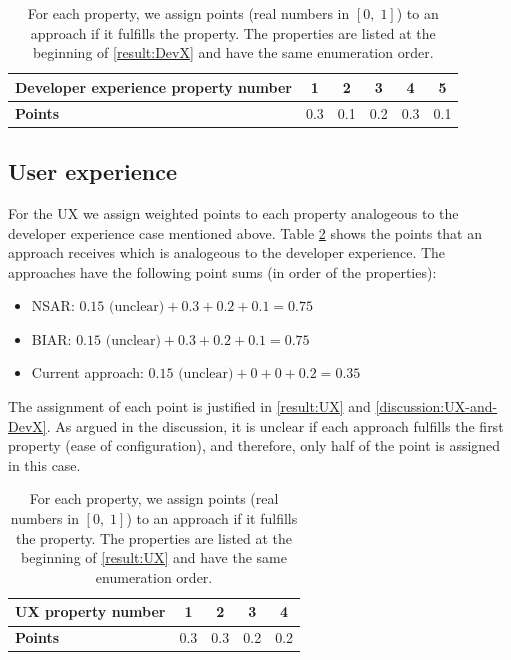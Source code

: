 \begin{table}[h!]
\centering
\begin{tabular}{||m{4cm}||ccccc||} 
\hline
 \textbf{Developer experience property number} & 1 & 2 & 3 & 4 & 5 \\
 \hline
 \textbf{Points} & 0.3 & 0.1 & 0.2 & 0.3 & 0.1 \\ 
 \hline
\end{tabular}
\caption{For each property, we assign points (real numbers in $[0,\;1]$) to an approach if it fulfills the property. The properties are listed at the beginning of \ref{result:DevX} and have the same enumeration order.}
\label{table:devx-points}
\end{table}

\subsection{User experience}
For the UX we assign weighted points to each property analogeous to the developer experience case mentioned above. Table \ref{table:ux-points} shows the points that an approach receives which is analogeous to the developer experience. The approaches have the following point sums (in order of the properties): 
\begin{itemize}
    \item NSAR: $0.15 \text{ (unclear)}+0.3+0.2+0.1 = 0.75$
    \item BIAR: $0.15 \text{ (unclear)}+0.3+0.2+0.1 = 0.75$
    \item Current approach: $0.15 \text{ (unclear)}+0+0+0.2 = 0.35$
\end{itemize}
The assignment of each point is justified in \ref{result:UX} and \ref{discussion:UX-and-DevX}. As argued in the discussion, it is unclear if each approach fulfills the first property (ease of configuration), and therefore, only half of the point is assigned in this case. 

\begin{table}[h!]
\centering
\begin{tabular}{||l||cccc||} 
\hline
 \textbf{UX property number} & 1 & 2 & 3 & 4 \\
 \hline
 \textbf{Points} & 0.3 & 0.3 & 0.2 & 0.2 \\ 
 \hline
\end{tabular}
\caption{For each property, we assign points (real numbers in $[0,\;1]$) to an approach if it fulfills the property. The properties are listed at the beginning of \ref{result:UX} and have the same enumeration order.}
\label{table:ux-points}
\end{table}

